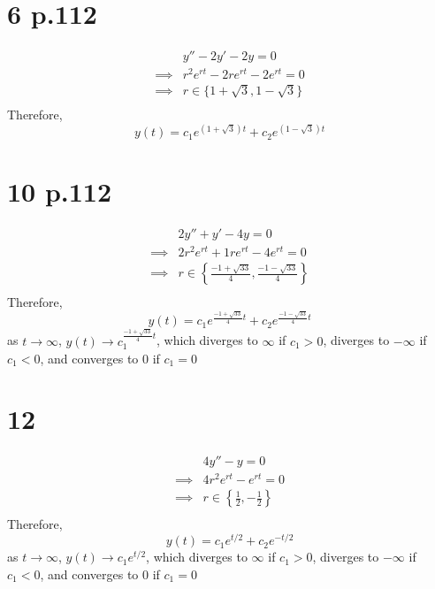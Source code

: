 \documentclass[11pt]{report}
\begin{document}
\section*{6 p.112}
\begin{equation*}
    \begin{aligned}
        & y'' - 2y'-2y = 0 \\
        \implies & r^2 e^{rt} - 2re^{rt} - 2e^{rt} = 0 \\
        \implies & r \in \{ 1 + \sqrt{3}, 1-\sqrt{3}\} \\
    \end{aligned}
\end{equation*}
Therefore,
\[
    y(t) = c_1e^{(1+\sqrt{3})t} + c_2e^{(1-\sqrt{3})t}
\]
\newpage
\section*{10 p.112}
\begin{equation*}
    \begin{aligned}
        & 2y'' + y'-4y = 0 \\
        \implies & 2r^2 e^{rt} + 1re^{rt} - 4e^{rt} = 0 \\
        \implies & r \in \left\{\frac{-1 + \sqrt{33}}{4},  \frac{-1 - \sqrt{33}}{4}\right\} \\
    \end{aligned}
\end{equation*}
Therefore,
\[
    y(t) = c_1e^{\frac{-1 + \sqrt{33}}{4}t} + c_2e^{\frac{-1 - \sqrt{33}}{4}t}
\]
as $t \to \infty$, $y(t) \to c_1^{\frac{-1 + \sqrt{33}}{4}t}$,
which diverges to $\infty$ if $c_1>0$, diverges to $-\infty$ if $c_1 < 0$, and converges to $0$ if $c_1 = 0$
\newpage
\section*{12}
\begin{equation*}
    \begin{aligned}
        & 4y'' - y = 0 \\
        \implies & 4r^2 e^{rt} - e^{rt} = 0 \\
        \implies & r \in \left\{\frac{1}{2},  -\frac{1}{2}\right\} \\
    \end{aligned}
\end{equation*}
Therefore,
\[
    y(t) = c_1e^{t/2} + c_2e^{-t/2}
\]
as $t \to \infty$, $y(t) \to c_1e^{t/2}$,
which diverges to $\infty$ if $c_1>0$, diverges to $-\infty$ if $c_1 < 0$, and converges to $0$ if $c_1 = 0$
\end{document}
